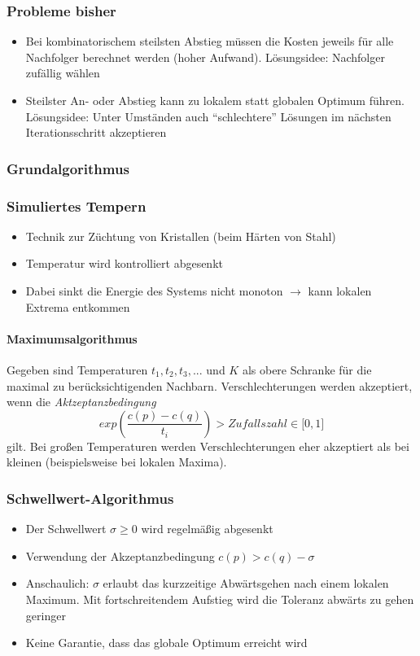 \subsubsection{Probleme bisher}
\begin{itemize}
	\item Bei kombinatorischem steilsten Abstieg müssen die Kosten jeweils für alle Nachfolger berechnet werden (hoher Aufwand). Lösungsidee: Nachfolger zufällig wählen
	\item Steilster An- oder Abstieg kann zu lokalem statt globalen Optimum führen. Lösungsidee: Unter Umständen auch "`schlechtere"' Lösungen im nächsten Iterationsschritt akzeptieren
\end{itemize}

\subsubsection{Grundalgorithmus}


\subsubsection{Simuliertes Tempern}
\begin{itemize}
	\item Technik zur Züchtung von Kristallen (beim Härten von Stahl)
	\item Temperatur wird kontrolliert abgesenkt
	\item Dabei sinkt die Energie des Systems nicht monoton \(\rightarrow\) kann lokalen Extrema entkommen
\end{itemize}

\paragraph{Maximumsalgorithmus}
Gegeben sind Temperaturen \(t_1,t_2,t_3,...\) und \(K\) als obere Schranke für die maximal zu berücksichtigenden Nachbarn. Verschlechterungen werden akzeptiert, wenn die \textit{Aktzeptanzbedingung}
\[exp(\frac{c(p)-c(q)}{t_i}) > Zufallszahl \in \lbrack 0,1 \rbrack\]
gilt. Bei großen Temperaturen werden Verschlechterungen eher akzeptiert als bei kleinen (beispielsweise bei lokalen Maxima).
\text{}\\


\subsubsection{Schwellwert-Algorithmus}
\begin{itemize}
	\item Der Schwellwert \(\sigma \geq 0\) wird regelmäßig abgesenkt
	\item Verwendung der Akzeptanzbedingung \(c(p) > c(q) - \sigma\)
	\item Anschaulich: \(\sigma\) erlaubt das kurzzeitige Abwärtsgehen nach einem lokalen Maximum. Mit fortschreitendem Aufstieg wird die Toleranz abwärts zu gehen geringer
	\item Keine Garantie, dass das globale Optimum erreicht wird
\end{itemize}

